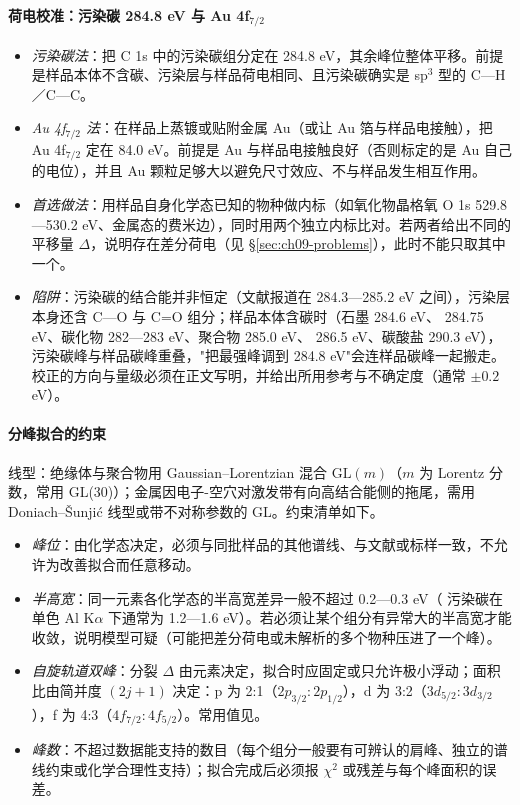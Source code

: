 \paragraph{荷电校准：污染碳 284.8 eV 与 Au 4f$_{7/2}$}
\begin{itemize}
\item \emph{污染碳法}：把 C 1s 中的污染碳组分定在 284.8 eV，其余峰位整体平移。前提是样品本体不含碳、污染层与样品荷电相同、且污染碳确实是 sp$^{3}$ 型的 C—H／C—C。
\item \emph{Au 4f$_{7/2}$ 法}：在样品上蒸镀或贴附金属 Au（或让 Au 箔与样品电接触），把 Au 4f$_{7/2}$ 定在 84.0 eV。前提是 Au 与样品电接触良好（否则标定的是 Au 自己的电位），并且 Au 颗粒足够大以避免尺寸效应、不与样品发生相互作用。
\item \emph{首选做法}：用样品自身化学态已知的物种做内标（如氧化物晶格氧 O 1s 529.8—530.2 eV、金属态的费米边），同时用两个独立内标比对。若两者给出不同的平移量 $\Delta$，说明存在差分荷电（见 §\ref{sec:ch09-problems}），此时不能只取其中一个。
\item \emph{陷阱}：污染碳的结合能并非恒定（文献报道在 284.3—285.2 eV 之间），污染层本身还含 C—O 与 C=O 组分；样品本体含碳时（石墨 284.6 eV、 284.75 eV、碳化物 282—283 eV、聚合物 285.0 eV、 286.5 eV、碳酸盐 290.3 eV），污染碳峰与样品碳峰重叠，"把最强峰调到 284.8 eV"会连样品碳峰一起搬走。校正的方向与量级必须在正文写明，并给出所用参考与不确定度（通常 $\pm0.2$ eV）。
\end{itemize}

\paragraph{分峰拟合的约束}
线型：绝缘体与聚合物用 Gaussian--Lorentzian 混合 $\mathrm{GL}(m)$（$m$ 为 Lorentz 分数，常用 GL(30)）；金属因电子-空穴对激发带有向高结合能侧的拖尾，需用 Doniach--Šunjić 线型或带不对称参数的 GL。约束清单如下。
\begin{itemize}
\item \emph{峰位}：由化学态决定，必须与同批样品的其他谱线、与文献或标样一致，不允许为改善拟合而任意移动。
\item \emph{半高宽}：同一元素各化学态的半高宽差异一般不超过 0.2—0.3 eV（ 污染碳在单色 Al K$\alpha$ 下通常为 1.2—1.6 eV）。若必须让某个组分有异常大的半高宽才能收敛，说明模型可疑（可能把差分荷电或未解析的多个物种压进了一个峰）。
\item \emph{自旋轨道双峰}：分裂 $\Delta$ 由元素决定，拟合时应固定或只允许极小浮动；面积比由简并度 $(2j+1)$ 决定：p 为 2:1（$2p_{3/2}:2p_{1/2}$），d 为 3:2（$3d_{5/2}:3d_{3/2}$），f 为 4:3（$4f_{7/2}:4f_{5/2}$）。常用值见。
\item \emph{峰数}：不超过数据能支持的数目（每个组分一般要有可辨认的肩峰、独立的谱线约束或化学合理性支持）；拟合完成后必须报 $\chi^{2}$ 或残差与每个峰面积的误差。
\end{itemize}

